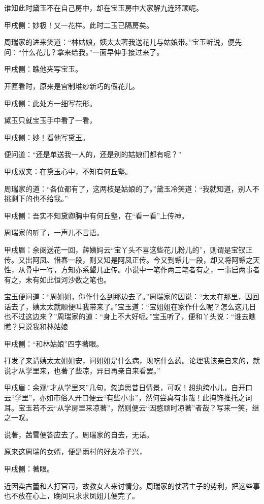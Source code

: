 \begin{parag}
    谁知此时黛玉不在自己房中，却在宝玉房中大家解九连环顽呢。\begin{note}甲戌侧：妙极！又一花样。此时二玉已隔房矣。\end{note}周瑞家的进来笑道：“林姑娘，姨太太著我送花儿与姑娘带。”宝玉听说，便先问：“什么花儿？拿来给我。”一面早伸手接过来了。\begin{note}甲戌侧：瞧他夹写宝玉。\end{note}开匣看时，原来是宫制堆纱新巧的假花儿。\begin{note}甲戌侧：此处方一细写花形。\end{note}黛玉只就宝玉手中看了一看，\begin{note}甲戌侧：妙！看他写黛玉。\end{note}便问道：“还是单送我一人的，还是别的姑娘们都有呢？”\begin{note}甲戌双夹：在黛玉心中，不知有何丘壑。\end{note}周瑞家的道：“各位都有了，这两枝是姑娘的了。”黛玉冷笑道：“我就知道，别人不挑剩下的也不给我。”\begin{note}甲戌侧：吾实不知黛卿胸中有何丘壑，在“看一看”上传神。\end{note}周瑞家的听了，一声儿不言语。\begin{note}甲戌眉：余阅送花一回，薛姨妈云“宝丫头不喜这些花儿粉儿的”，则谓是宝钗正传。又出阿凤、惜春一段，则又知是阿凤正传。今又到颦儿一段，却又将阿颦之天性，从骨中一写，方知亦系颦儿正传。小说中一笔作两三笔者有之，一事启两事者有之，未有如此恒河沙数之笔也。\end{note}宝玉便问道：“周姐姐，你作什么到那边去了。”周瑞家的因说：“太太在那里，因回话去了，姨太太就顺便叫我带来了。”宝玉道：“宝姐姐在家作什么呢？怎么这几日也不过这边来？”周瑞家的道：“身上不大好呢。”宝玉听了，便和丫头说：“谁去瞧瞧？只说我和林姑娘\begin{note}甲戌侧：“和林姑娘”四字著眼。\end{note}打发了来请姨太太姐姐安，问姐姐是什么病，现吃什么药。论理我该亲自来的，就说才从学里来，也著了些凉，异日再亲自来看罢。”\begin{note}甲戌眉：余观“才从学里来”几句，忽追思昔日情景，可叹！想纨绔小儿，自开口云“学里”，亦如市俗人开口便云“有些小事”，然何尝真有事哉！此掩饰推托之词耳。宝玉若不云“从学房里来凉著”，然则便云“因憨顽时凉著”者哉？写来一笑，继之一叹。\end{note}说著，茜雪便答应去了。周瑞家的自去，无话。
\end{parag}


\begin{parag}
    原来这周瑞的女婿，便是雨村的好友冷子兴，\begin{note}甲戌侧：著眼。\end{note}近因卖古董和人打官司，故教女人来讨情分。周瑞家的仗著主子的势利，把这些事也不放在心上，晚间只求求凤姐儿便完了。
\end{parag}


